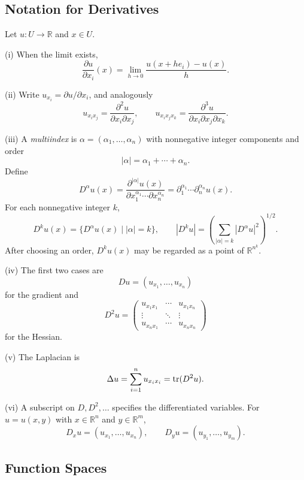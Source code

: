 \subsection{Notation for Derivatives}
\label{sec:notation-for-derivatives}

\begin{definition}
\label{def:derivative-notation-multiindex}
Let $u:U\to\mathbb R$ and $x\in U$.

(i) When the limit exists,
\[
\frac{\partial u}{\partial x_i}(x)
=\lim_{h\to0}\frac{u(x+he_i)-u(x)}{h}.
\]

(ii) Write $u_{x_i}=\partial u/\partial x_i$, and analogously
\[
u_{x_ix_j}=\frac{\partial^2u}{\partial x_i\partial x_j},
\qquad
u_{x_ix_jx_k}=\frac{\partial^3u}{\partial x_i\partial x_j\partial x_k}.
\]

(iii) A \textit{multiindex} is $\alpha=(\alpha_1,\ldots,\alpha_n)$ with nonnegative integer components and order
\[
|\alpha|=\alpha_1+\cdots+\alpha_n.
\]
Define
\[
D^\alpha u(x)
=\frac{\partial^{|\alpha|}u(x)}
{\partial x_1^{\alpha_1}\cdots\partial x_n^{\alpha_n}}
=\partial_1^{\alpha_1}\cdots\partial_n^{\alpha_n}u(x).
\]
For each nonnegative integer $k$,
\[
D^ku(x)=\{D^\alpha u(x)\mid |\alpha|=k\},
\qquad
|D^ku|=\left(\sum_{|\alpha|=k}|D^\alpha u|^2\right)^{1/2}.
\]
After choosing an order, $D^ku(x)$ may be regarded as a point of $\mathbb R^{n^k}$.

(iv) The first two cases are
\[
Du=(u_{x_1},\ldots,u_{x_n})
\]
for the gradient and
\[
D^2u=
\begin{pmatrix}
u_{x_1x_1}&\cdots&u_{x_1x_n}\\
\vdots&\ddots&\vdots\\
u_{x_nx_1}&\cdots&u_{x_nx_n}
\end{pmatrix}
\]
for the Hessian.

(v) The Laplacian is
\[
\Delta u=\sum_{i=1}^nu_{x_ix_i}=\operatorname{tr}(D^2u).
\]

(vi) A subscript on $D,D^2,\ldots$ specifies the differentiated variables. For $u=u(x,y)$ with $x\in\mathbb R^n$ and $y\in\mathbb R^m$,
\[
D_xu=(u_{x_1},\ldots,u_{x_n}),
\qquad
D_yu=(u_{y_1},\ldots,u_{y_m}).
\]
\end{definition}

\subsection{Function Spaces}
\label{sec:function-spaces-notation}

